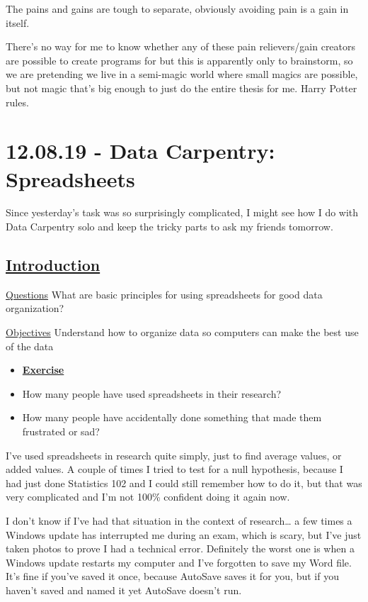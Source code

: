 \documentclass[12pt]{article}
\begin{document}
The pains and gains are tough to separate, obviously avoiding pain is a gain in itself.

There's no way for me to know whether any of these pain relievers/gain creators are possible to create programs for but this is apparently only to brainstorm, so we are pretending we live in a semi-magic world where small magics are possible, but not magic that's big enough to just do the entire thesis for me. Harry Potter rules.

\newpage
\section{12.08.19 - Data Carpentry: Spreadsheets}
Since yesterday’s task was so surprisingly complicated, I might see how I do with Data Carpentry solo and keep the tricky parts to ask my friends tomorrow.

\subsection{\textbf{\href{https://datacarpentry.org/spreadsheets-socialsci/00-intro/index.html}{Introduction}}}
\setlength{\parskip}{0.5em}


\color{Gray}\underline{Questions}
\newline What are basic principles for using spreadsheets for good data organization?

\underline{Objectives}
\newline Understand how to organize data so computers can make the best use of the data

\begin{itemize}
\renewcommand{\labelitemi}{$\nobullet$}
\item \textbf{\underline{Exercise}}
\renewcommand{\labelitemi}{$\bullet$}
    \item How many people have used spreadsheets in their research?
    \item How many people have accidentally done something that made them frustrated or sad?
\end{itemize}\color{black}

I’ve used spreadsheets in research quite simply, just to find average values, or added values. A couple of times I tried to test for a null hypothesis, because I had just done Statistics 102 and I could still remember how to do it, but that was very complicated and I’m not 100\% confident doing it again now.

I don’t know if I’ve had that situation in the context of research… a few times a Windows update has interrupted me during an exam, which is scary, but I’ve just taken photos to prove I had a technical error. Definitely the worst one is when a Windows update restarts my computer and I’ve forgotten to save my Word file. It’s fine if you’ve saved it once, because AutoSave saves it for you, but if you haven’t saved and named it yet AutoSave doesn’t run.
\end{document}
